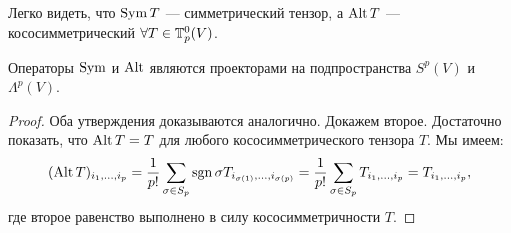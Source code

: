 Легко видеть, что $\operatorname{Sym} T$ --- симметрический тензор, а $\operatorname{Alt} T$ --- кососимметрический $\forall T \in \mathbb{T}_p^0(V)$.

\begin{proposal}
    Операторы $\operatorname{Sym}$ и $\operatorname{Alt}$ являются проекторами на подпространства $S^p(V)$ и $\Lambda^p(V)$.
\end{proposal}

\begin{proof}
    Оба утверждения доказываются аналогично. Докажем второе. Достаточно показать, что $\operatorname{Alt} T = T$ для любого кососимметрического тензора $T$. Мы имеем:
    \[
        (\operatorname{Alt} T)_{i_1, \ldots, i_p} = \frac{1}{p!}\sum_{\sigma \in S_p}\operatorname{sgn}\sigma T_{i_{\sigma(1)}, \ldots, i_{\sigma(p)}} = \frac{1}{p!}\sum_{\sigma \in S_p}T_{i_1, \ldots, i_p} = T_{i_1, \ldots, i_p},
    \]
    где второе равенство выполнено в силу кососимметричности $T$.
\end{proof}

